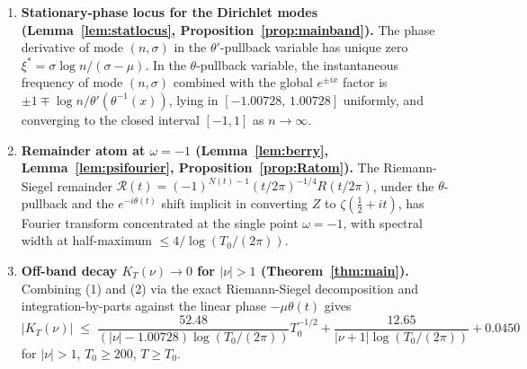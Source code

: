 \documentclass[11pt]{article}
\begin{document}
\begin{enumerate}
\item \textbf{Stationary-phase locus for the Dirichlet modes (Lemma~\ref{lem:statlocus}, Proposition~\ref{prop:mainband}).} The phase derivative of mode $(n,\sigma)$ in the $\theta'$-pullback variable has unique zero $\xi^{*} = \sigma\log n/(\sigma-\mu)$. In the $\theta$-pullback variable, the instantaneous frequency of mode $(n,\sigma)$ combined with the global $e^{\pm ix}$ factor is $\pm 1\mp\log n/\theta'(\theta^{-1}(x))$, lying in $[-1.00728,\,1.00728]$ uniformly, and converging to the closed interval $[-1,1]$ as $n\to\infty$.

\item \textbf{Remainder atom at $\omega=-1$ (Lemma~\ref{lem:berry}, Lemma~\ref{lem:psifourier}, Proposition~\ref{prop:Ratom}).} The Riemann-Siegel remainder $\mathcal{R}(t) = (-1)^{N(t)-1}(t/2\pi)^{-1/4}R(t/2\pi)$, under the $\theta$-pullback and the $e^{-i\theta(t)}$ shift implicit in converting $Z$ to $\zeta(\tfrac12+it)$, has Fourier transform concentrated at the single point $\omega=-1$, with spectral width at half-maximum $\le 4/\log(T_{0}/(2\pi))$.

\item \textbf{Off-band decay $K_{T}(\nu)\to 0$ for $|\nu|>1$ (Theorem~\ref{thm:main}).} Combining (1) and (2) via the exact Riemann-Siegel decomposition and integration-by-parts against the linear phase $-\mu\theta(t)$ gives
\[
  |K_{T}(\nu)| \;\le\; \frac{52.48}{(|\nu|-1.00728)\log(T_{0}/(2\pi))}T_{0}^{-1/2} + \frac{12.65}{|\nu+1|\log(T_{0}/(2\pi))} + 0.0450
\]
for $|\nu|>1$, $T_{0}\ge 200$, $T\ge T_{0}$.
\end{enumerate}
\end{document}
